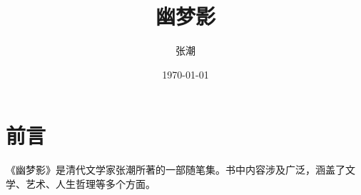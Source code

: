 \documentclass{book}
\title{幽梦影}
\author{张潮}
\date{\today}
\begin{document}
\maketitle
\tableofcontents


\chapter*{前言}
《幽梦影》是清代文学家张潮所著的一部随笔集。书中内容涉及广泛，涵盖了文学、艺术、人生哲理等多个方面。






\end{document}
